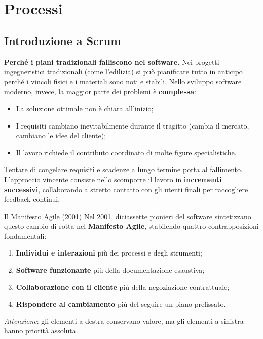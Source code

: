 \documentclass[12pt]{extarticle}
\begin{document}
\newpage

\section{Processi}

\subsection{Introduzione a Scrum}

\noindent \textbf{Perché i piani tradizionali falliscono nel software.} Nei progetti ingegneristici tradizionali (come l'edilizia) si può pianificare tutto in anticipo perché i vincoli fisici e i materiali sono noti e stabili. Nello sviluppo software moderno, invece, la maggior parte dei problemi è \textbf{complessa}:
\begin{itemize}
    \item La soluzione ottimale non è chiara all'inizio;
    \item I requisiti cambiano inevitabilmente durante il tragitto (cambia il mercato, cambiano le idee del cliente);
    \item Il lavoro richiede il contributo coordinato di molte figure specialistiche.
\end{itemize}
Tentare di congelare requisiti e scadenze a lungo termine porta al fallimento. L'approccio vincente consiste nello scomporre il lavoro in \textbf{incrementi successivi}, collaborando a stretto contatto con gli utenti finali per raccogliere feedback continui.

\begin{cbox}{Il Manifesto Agile (2001)}
\noindent Nel 2001, diciassette pionieri del software sintetizzano questo cambio di rotta nel \textbf{Manifesto Agile}, stabilendo quattro contrapposizioni fondamentali:
\begin{enumerate}
    \item \textbf{Individui e interazioni} più dei processi e degli strumenti;
    \item \textbf{Software funzionante} più della documentazione esaustiva;
    \item \textbf{Collaborazione con il cliente} più della negoziazione contrattuale;
    \item \textbf{Rispondere al cambiamento} più del seguire un piano prefissato.
\end{enumerate}
\medskip
\noindent \textit{Attenzione}: gli elementi a destra conservano valore, ma gli elementi a sinistra hanno priorità assoluta.
\end{cbox}
\end{document}
